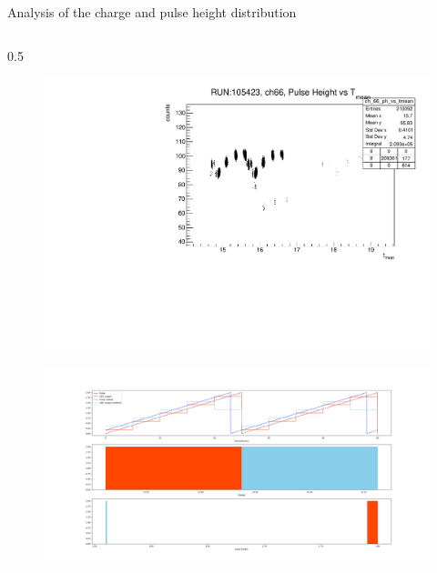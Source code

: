 \documentclass{beamer}[10pt]
\begin{document}
\begin{frame}{Analysis of the charge and pulse height distribution}
\begin{columns}
\begin{column}{0.5\framewidth}
\begin{figure}[H]
   \includegraphics[width= .850\columnwidth]{figures/pdf/phtmean.pdf}
   \label{fig:wffytl}
 \end{figure}
\vspace{-10mm}
\begin{figure}[H]
   \centering
   \includegraphics[width= 1.3\columnwidth]{figures/png/pres.png}
   \label{fig:wffytl}
 \end{figure}
\end{column}
\end{columns}
\end{frame}

\end{document}
